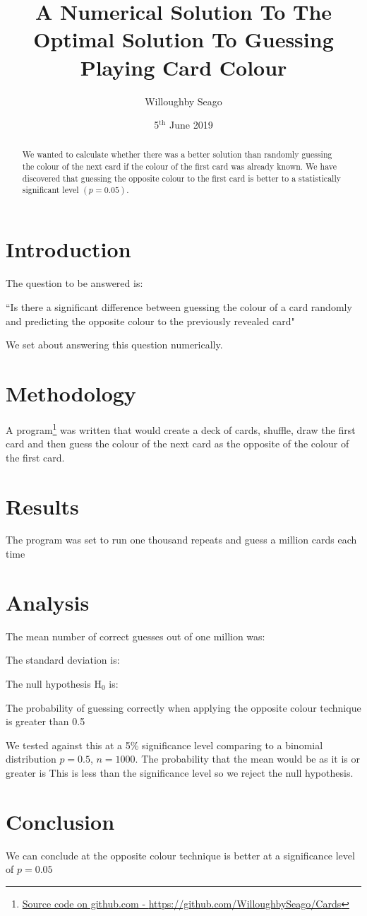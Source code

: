 \documentclass{article}
\date{5\(^\text{th}\) June 2019}
\author{Willoughby Seago}
\title{A Numerical Solution To The Optimal Solution To Guessing Playing Card Colour}
\begin{document}
	\maketitle
	\begin{abstract}
		We wanted to calculate whether there was a better solution than randomly guessing the colour of the next card if the colour of the first card was already known. We have discovered that guessing the opposite colour to the first card is better to a statistically significant level \((p=0.05)\).
	\end{abstract}
    \hspace{2em}
    \tableofcontents
    \section*{Introduction}
    The question to be answered is:
    
    ``Is there a significant difference between guessing the colour of a card randomly and predicting the opposite colour to the previously revealed card"
    
    We set about answering this question numerically.
    \section{Methodology}
    A program\footnote{\href{https://github.com/WilloughbySeago/Cards}{Source code on github.com - }\url{https://github.com/WilloughbySeago/Cards}} was written that would create a deck of cards, shuffle, draw the first card and then guess the colour of the next card as the opposite of the colour of the first card.
    \section{Results}
    The program was set to run one thousand repeats and guess a million cards each time
    \section{Analysis}
    The mean number of correct guesses out of one million was: %
    
    The standard deviation is: %
    
    The null hypothesis \(\mathrm{H}_0\) is: 
    
    The probability of guessing correctly when applying the opposite colour technique is greater than 0.5
    
    We tested against this at a 5\% significance level comparing to a binomial distribution \(p=0.5\), \(n=1000\).
    The probability that the mean would be as it is or greater is %
    This is less than the significance level so we reject the null hypothesis.
    
    
    \section*{Conclusion}
    We can conclude at the opposite colour technique is better at a significance level of \(p=0.05\)
\end{document}
